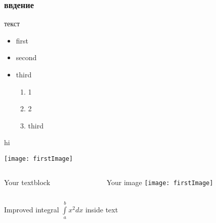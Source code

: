 \documentclass[notes,compress]{beamer}
\begin{document}
    \begin{frame}

    \end{frame}
    
    \begin{frame}

    \end{frame}
    
    
    \begin{frame}
        \frametitle{ввдение}
        {\Huge текст}
        \begin{itemize}
          \item<+-> first
          \item<+-> second
          \item<+-> third

            \begin{enumerate}
              \item<1-> 1
              \item<1-2> \alert<5-> {2}
              \item<3-> third
            \end{enumerate}
        \end{itemize}
         {hi}
    \end{frame}

    \begin{frame}
        \texttt{[image: firstImage]}
    \end{frame}

    \begin{frame}
    	\begin{columns}[T]
        	\begin{column}{.5\textwidth}
            	Your textblock
           	
        	\end{column}
        	\begin{column}{.5\textwidth}
            	\begin{block}{Your image}
                	\texttt{[image: firstImage]}
            	\end{block}
        	\end{column}
    	\end{columns}
	\end{frame}

    \begin{frame}
        Improved integral $\int\limits_{a}^{b} x^2 dx$ inside text
    \end{frame}
\end{document}
